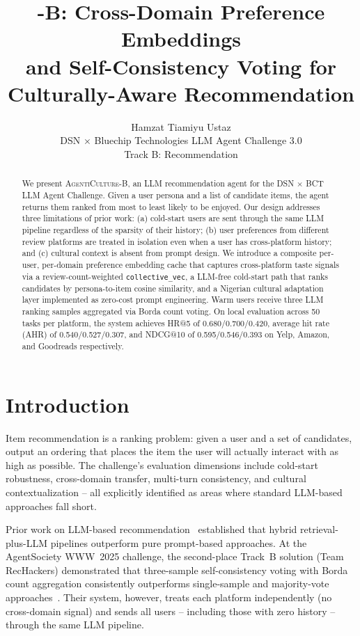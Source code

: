 \documentclass[11pt]{article}
\title{\system-B: Cross-Domain Preference Embeddings\\
and Self-Consistency Voting for Culturally-Aware Recommendation}
\author{
  Hamzat Tiamiyu Ustaz \\
  DSN $\times$ Bluechip Technologies LLM Agent Challenge 3.0 \\
  Track B: Recommendation
}
\newcommand{\system}{\textsc{AgentiCulture}\xspace}
\begin{document}
\maketitle

\begin{abstract}
We present \system-B, an LLM recommendation agent for the DSN $\times$ BCT
LLM Agent Challenge.
Given a user persona and a list of candidate items, the agent returns them
ranked from most to least likely to be enjoyed.
Our design addresses three limitations of prior work: (a) cold-start users
are sent through the same LLM pipeline regardless of the sparsity of their
history; (b) user preferences from different review platforms are treated in
isolation even when a user has cross-platform history; and (c) cultural context
is absent from prompt design.
We introduce a composite per-user, per-domain preference embedding cache that
captures cross-platform taste signals via a review-count-weighted
\texttt{collective\_vec}, a LLM-free cold-start path that ranks candidates by
persona-to-item cosine similarity, and a Nigerian cultural adaptation layer
implemented as zero-cost prompt engineering.
Warm users receive three LLM ranking samples aggregated via Borda count voting.
On local evaluation across 50 tasks per platform, the system achieves
HR@5 of 0.680/0.700/0.420, average hit rate (AHR) of 0.540/0.527/0.307,
and NDCG@10 of 0.595/0.546/0.393 on Yelp, Amazon, and Goodreads respectively.
\end{abstract}

\section{Introduction}

Item recommendation is a ranking problem: given a user and a set of candidates,
output an ordering that places the item the user will actually interact with
as high as possible.
The challenge's evaluation dimensions include cold-start robustness,
cross-domain transfer, multi-turn consistency, and cultural contextualization --
all explicitly identified as areas where standard LLM-based approaches fall
short.

Prior work on LLM-based recommendation~\citep{lian2024recai,huang2025intrecagent}
established that hybrid retrieval-plus-LLM pipelines outperform pure
prompt-based approaches.
At the AgentSociety WWW~2025 challenge, the second-place Track~B solution
(Team RecHackers) demonstrated that three-sample self-consistency voting with
Borda count aggregation consistently outperforms single-sample and majority-vote
approaches~\citep{guo2025agentsocietychallenge}.
Their system, however, treats each platform independently (no cross-domain
signal) and sends all users -- including those with zero history -- through
the same LLM pipeline.
\end{document}
